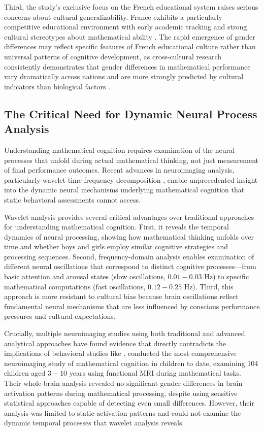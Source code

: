 \documentclass[pdflatex,sn-nature]{sn-jnl}%
\theoremstyle{thmstyleone}%
\theoremstyle{thmstyletwo}%
\theoremstyle{thmstylethree}%
\begin{document}
Third, the study's exclusive focus on the French educational system raises serious concerns about cultural generalizability. France exhibits a particularly competitive educational environment with early academic tracking and strong cultural stereotypes about mathematical ability \cite{guiso2008culture}. The rapid emergence of gender differences may reflect specific features of French educational culture rather than universal patterns of cognitive development, as cross-cultural research consistently demonstrates that gender differences in mathematical performance vary dramatically across nations and are more strongly predicted by cultural indicators than biological factors \cite{else2010cross}.

\subsection{The Critical Need for Dynamic Neural Process Analysis}
Understanding mathematical cognition requires examination of the neural processes that unfold during actual mathematical thinking, not just measurement of final performance outcomes. Recent advances in neuroimaging analysis, particularly wavelet time-frequency decomposition \cite{torrence1998practical,cohen2014analyzing}, enable unprecedented insight into the dynamic neural mechanisms underlying mathematical cognition that static behavioral assessments cannot access.

Wavelet analysis provides several critical advantages over traditional approaches for understanding mathematical cognition. First, it reveals the temporal dynamics of neural processing, showing how mathematical thinking unfolds over time and whether boys and girls employ similar cognitive strategies and processing sequences. Second, frequency-domain analysis enables examination of different neural oscillations that correspond to distinct cognitive processes—from basic attention and arousal states (slow oscillations, $0.01-0.03$ Hz) to specific mathematical computations (fast oscillations, $0.12-0.25$ Hz). Third, this approach is more resistant to cultural bias because brain oscillations reflect fundamental neural mechanisms that are less influenced by conscious performance pressures and cultural expectations.

Crucially, multiple neuroimaging studies using both traditional and advanced analytical approaches have found evidence that directly contradicts the implications of behavioral studies like \cite{martinot2025mathematical}. \cite{kersey2019no} conducted the most comprehensive neuroimaging study of mathematical cognition in children to date, examining 104 children aged $3-10$ years using functional MRI during mathematical tasks. Their whole-brain analysis revealed no significant gender differences in brain activation patterns during mathematical processing, despite using sensitive statistical approaches capable of detecting even small differences. However, their analysis was limited to static activation patterns and could not examine the dynamic temporal processes that wavelet analysis reveals.
\end{document}
